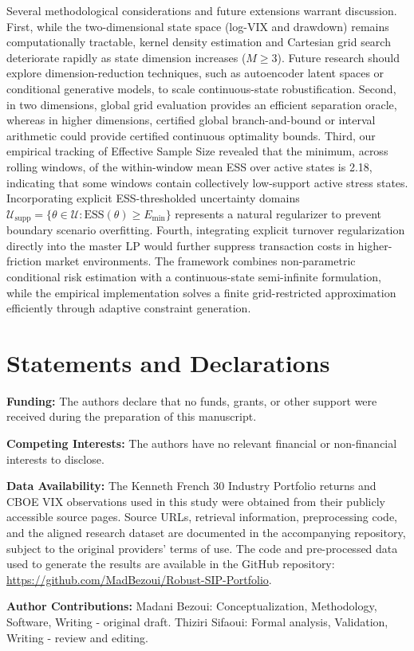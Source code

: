 \documentclass[11pt, a4paper]{article}
\begin{document}
Several methodological considerations and future extensions warrant discussion. First, while the two-dimensional state space (log-VIX and drawdown) remains computationally tractable, kernel density estimation and Cartesian grid search deteriorate rapidly as state dimension increases ($M \ge 3$). Future research should explore dimension-reduction techniques, such as autoencoder latent spaces or conditional generative models, to scale continuous-state robustification. Second, in two dimensions, global grid evaluation provides an efficient separation oracle, whereas in higher dimensions, certified global branch-and-bound or interval arithmetic could provide certified continuous optimality bounds. Third, our empirical tracking of Effective Sample Size revealed that the minimum, across rolling windows, of the within-window mean ESS over active states is 2.18, indicating that some windows contain collectively low-support active stress states. Incorporating explicit ESS-thresholded uncertainty domains $\mathcal{U}_{\text{supp}} = \{\theta \in \mathcal{U} : \text{ESS}(\theta) \ge E_{\min}\}$ represents a natural regularizer to prevent boundary scenario overfitting. Fourth, integrating explicit turnover regularization directly into the master LP would further suppress transaction costs in higher-friction market environments. The framework combines non-parametric conditional risk estimation with a continuous-state semi-infinite formulation, while the empirical implementation solves a finite grid-restricted approximation efficiently through adaptive constraint generation.

\newpage


\section*{Statements and Declarations}

\textbf{Funding:} The authors declare that no funds, grants, or other support were received during the preparation of this manuscript.

\textbf{Competing Interests:} The authors have no relevant financial or non-financial interests to disclose.

\textbf{Data Availability:} The Kenneth French 30 Industry Portfolio returns and CBOE VIX observations used in this study were obtained from their publicly accessible source pages. Source URLs, retrieval information, preprocessing code, and the aligned research dataset are documented in the accompanying repository, subject to the original providers' terms of use. The code and pre-processed data used to generate the results are available in the GitHub repository: \url{https://github.com/MadBezoui/Robust-SIP-Portfolio}.

\textbf{Author Contributions:} Madani Bezoui: Conceptualization, Methodology, Software, Writing - original draft. Thiziri Sifaoui: Formal analysis, Validation, Writing - review and editing.


\end{document}
